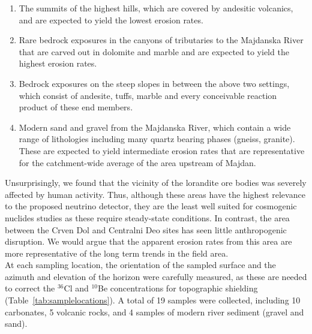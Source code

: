 \documentclass[titlepage]{article}
\begin{document}
\begin{enumerate}
\item The summits of the highest hills, which are covered by andesitic
  volcanics, and are expected to yield the lowest erosion rates.
\item Rare bedrock exposures in the canyons of tributaries to the
  Majdanska River that are carved out in dolomite and marble and are
  expected to yield the highest erosion rates.
\item Bedrock exposures on the steep slopes in between the above two
  settings, which consist of andesite, tuffs, marble and every
  conceivable reaction product of these end members.
\item Modern sand and gravel from the Majdanska River, which contain a
  wide range of lithologies including many quartz bearing phases
  (gneiss, granite). These are expected to yield intermediate erosion
  rates that are representative for the catchment-wide average of the
  area upstream of Majdan.
\end{enumerate}

Unsurprisingly, we found that the vicinity of the lorandite ore bodies
was severely affected by human activity.  Thus, although these areas
have the highest relevance to the proposed neutrino detector, they are
the least well suited for cosmogenic nuclides studies as these require
steady-state conditions. In contrast, the area between the Crven Dol
and Centralni Deo sites has seen little anthropogenic disruption. We
would argue that the apparent erosion rates from this area are more
representative of the long term trends in the field area.\\

At each sampling location, the orientation of the sampled surface and
the azimuth and elevation of the horizon were carefully measured, as
these are needed to correct the $^{36}$Cl and $^{10}$Be concentrations
for topographic shielding (Table~\ref{tab:samplelocations}). A total
of 19 samples were collected, including 10 carbonates, 5 volcanic
rocks, and 4 samples of modern river sediment (gravel and sand).
\end{document}
